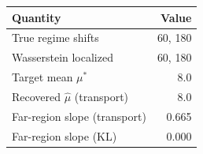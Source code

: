 \begin{tabular}{lr}
\toprule
Quantity & Value \\
\midrule
True regime shifts & 60, 180 \\
Wasserstein localized & 60, 180 \\
Target mean $\mu^*$ & 8.0 \\
Recovered $\hat\mu$ (transport) & 8.0 \\
Far-region slope (transport) & 0.665 \\
Far-region slope (KL) & 0.000 \\
\bottomrule
\end{tabular}
